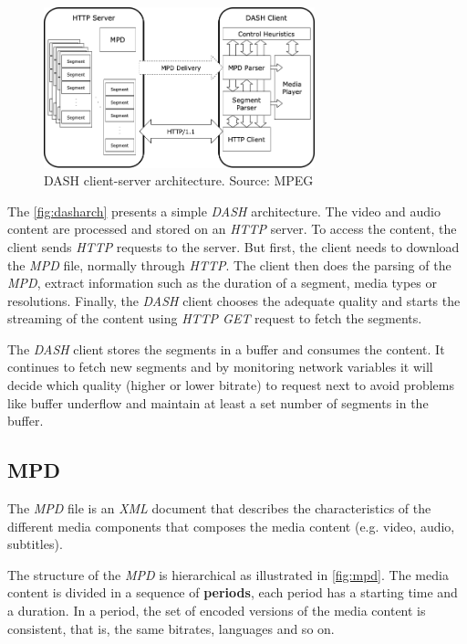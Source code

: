 \begin{figure}[h]
  \centering
  \includegraphics[width=0.7\textwidth]{img/dasharch.png}
  \caption{DASH client-server architecture. Source: MPEG \cite{ios1}}
  \label{fig:dasharch}
\end{figure}

The \autoref{fig:dasharch} presents a simple \textit{DASH} architecture. The video and audio
content are processed and stored on an \textit{HTTP} server. To access the content, the client
sends \textit{HTTP} requests to the server. But first, the client needs to download the 
\textit{MPD} file, normally through \textit{HTTP}. The client then does the
parsing of the \textit{MPD}, extract information such as the duration of a segment, media types or 
resolutions. Finally, the \textit{DASH} client chooses the adequate quality and starts the 
streaming of the content using \textit{HTTP GET} request to fetch the segments.

The \textit{DASH} client stores the segments in a buffer and consumes the content. It continues
to fetch new segments and by monitoring network variables it will decide which quality (higher
or lower bitrate) to request next to avoid problems like buffer underflow and maintain at 
least a set number of segments in the buffer.

\subsection{MPD}
\label{sec:mpd}
The \textit{MPD} file is an \textit{XML} document that describes the characteristics
of the different media components that composes the media content (e.g. video, audio, subtitles).

The structure of the \textit{MPD} is hierarchical as illustrated in \autoref{fig:mpd}. The media content is divided in a sequence of
\textbf{periods}, each period has a starting time and a duration. In a period, the set of encoded
versions of the media content is consistent, that is, the same bitrates, languages and so on.

